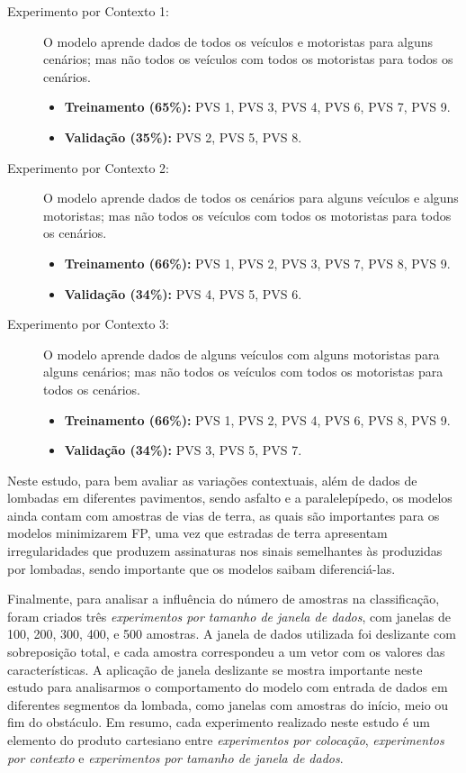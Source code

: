 \begin{description}
	
	\item[Experimento por Contexto 1:] O modelo aprende dados de todos os veículos e motoristas para alguns cenários; mas não todos os veículos com todos os motoristas para todos os cenários.
    \begin{itemize}
        \item \textbf{Treinamento (65\%):} PVS 1, PVS 3, PVS 4, PVS 6, PVS 7, PVS 9. 
        \item \textbf{Validação (35\%):} PVS 2, PVS 5, PVS 8.
    \end{itemize}
    
    \item[Experimento por Contexto 2:] O modelo aprende dados de todos os cenários para alguns veículos e alguns motoristas; mas não todos os veículos com todos os motoristas para todos os cenários.
    \begin{itemize}
        \item \textbf{Treinamento (66\%):} PVS 1, PVS 2, PVS 3, PVS 7, PVS 8, PVS 9.
        \item \textbf{Validação (34\%):} PVS 4, PVS 5, PVS 6.
    \end{itemize}
    
    \item[Experimento por Contexto 3:] O modelo aprende dados de alguns veículos com alguns motoristas para alguns cenários; mas não todos os veículos com todos os motoristas para todos os cenários.
    \begin{itemize}
        \item \textbf{Treinamento (66\%):} PVS 1, PVS 2, PVS 4, PVS 6, PVS 8, PVS 9.
        \item \textbf{Validação (34\%):} PVS 3, PVS 5, PVS 7.
    \end{itemize}
    
\end{description}

Neste estudo, para bem avaliar as variações contextuais, além de dados de lombadas em diferentes pavimentos, sendo asfalto e a paralelepípedo, os modelos ainda contam com amostras de vias de terra, as quais são importantes para os modelos minimizarem FP, uma vez que estradas de terra apresentam irregularidades que produzem assinaturas nos sinais semelhantes às produzidas por lombadas, sendo importante que os modelos saibam diferenciá-las. 

Finalmente, para analisar a influência do número de amostras na classificação, foram criados três \emph{experimentos por tamanho de janela de dados}, com janelas de 100, 200, 300, 400, e 500 amostras. A janela de dados utilizada foi deslizante com sobreposição total, e cada amostra correspondeu a um vetor com os valores das características. A aplicação de janela deslizante se mostra importante neste estudo para analisarmos o comportamento do modelo com entrada de dados em diferentes segmentos da lombada, como janelas com amostras do início, meio ou fim do obstáculo. Em resumo, cada experimento realizado neste estudo é um elemento do produto cartesiano entre \emph{experimentos por colocação}, \emph{experimentos por contexto} e \emph{experimentos por tamanho de janela de dados}.

